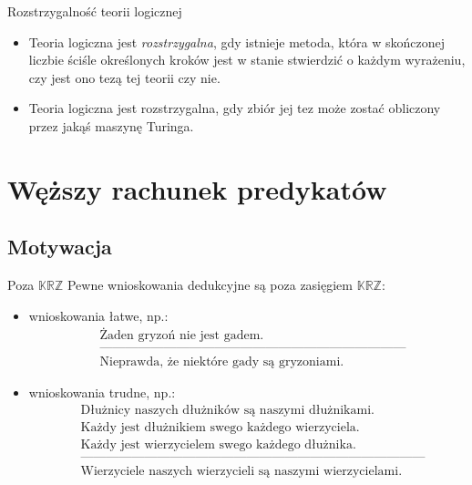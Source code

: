 \documentclass{beamer}
\newcommand {\KRZ} {\ensuremath{\mathbb{KRZ}}}
\begin{document}
\begin{frame}{Rozstrzygalność teorii logicznej}%
\begin{itemize}
    \item Teoria logiczna jest \emph{rozstrzygalna}, gdy istnieje metoda, która w skończonej liczbie ściśle określonych kroków jest w stanie stwierdzić o każdym wyrażeniu, czy jest ono tezą tej teorii czy nie.%
    \item Teoria logiczna jest rozstrzygalna, gdy zbiór jej tez może zostać obliczony przez jakąś maszynę Turinga.
\end{itemize}
\end{frame}

\section{Węższy rachunek predykatów}
\subsection{Motywacja}

\begin{frame}{Poza \KRZ}
Pewne wnioskowania dedukcyjne są poza zasięgiem \KRZ:
%
\begin{itemize}
\item wnioskowania łatwe, np.:
%
\begin{eqnarray*}
& \textrm{Żaden gryzoń nie jest gadem.} \nonumber \\
& \textrm{------------------------------------------------------------------------}\nonumber \\
& \textrm{Nieprawda, że niektóre gady są gryzoniami.}
\end{eqnarray*}
%
\item wnioskowania trudne, np.:
%
\begin{eqnarray*}
& \textrm{Dłużnicy naszych dłużników są naszymi dłużnikami.}\nonumber \\
& \textrm{Każdy jest dłużnikiem swego każdego wierzyciela.}\nonumber \\
& \textrm{Każdy jest wierzycielem swego każdego dłużnika.}\nonumber \\
& \textrm{---------------------------------------------------------------------------------}\nonumber \\
& \textrm{Wierzyciele naszych wierzycieli są naszymi wierzycielami.}
\end{eqnarray*}
\end{itemize}
\end{frame}
\end{document}
